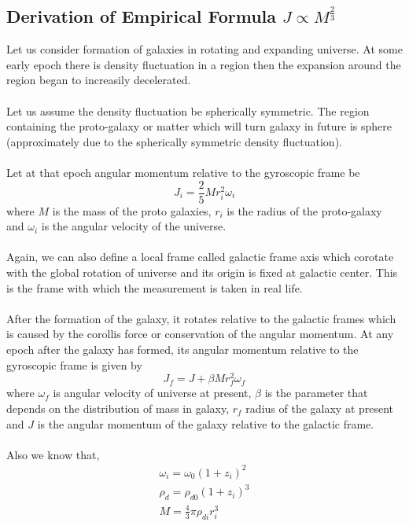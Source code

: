\subsection{Derivation of Empirical Formula $J\propto M^\frac{2}{3}$}
Let us consider formation of galaxies in rotating and expanding universe. At some early epoch there is density fluctuation in a region then the expansion around the region began to increasily decelerated.\\\\
Let us assume the density fluctuation be spherically symmetric. The region containing the proto-galaxy or matter which will turn galaxy in future is sphere (approximately due to the spherically symmetric density fluctuation).\\\\
Let at that epoch angular momentum relative to the gyroscopic frame be
\begin{equation}\label{J-i}
J_i=\frac{2}{5}M r_i^2 \omega_i
\end{equation}
where $M$ is the mass of the proto galaxies, $r_i$  is the radius of the proto-galaxy and $\omega_i$ is the angular velocity of the universe.\\\\
Again, we can also define a local frame called galactic frame axis which corotate with the global rotation of universe and its origin is fixed at galactic center. This is the frame with which the measurement is taken in real life.\\\\
After the formation of the galaxy, it rotates relative to the galactic frames which is caused by the corollis force or conservation of the angular momentum. At any epoch after the galaxy has formed, its angular momentum relative to the gyroscopic frame is given by
\begin{equation}\label{J-f}
J_f=J+\beta M r_f^2 \omega_f
\end{equation}
where $\omega_f$ is angular velocity of universe at present, $\beta$ is the parameter that depends on the distribution of mass in galaxy, $r_f$ radius of the galaxy at present and $J$ is the angular momentum of the galaxy relative to the galactic frame.\\\\
Also we know that,
\begin{equation}\label{om_rh_m}
\begin{aligned}
\omega_i=\omega_0(1+z_i)^2\\
\rho_d=\rho_{d0}(1+z_i)^3\\
M=\frac{4}{3}\pi\rho_{di}r_i^3
\end{aligned}
\end{equation}
